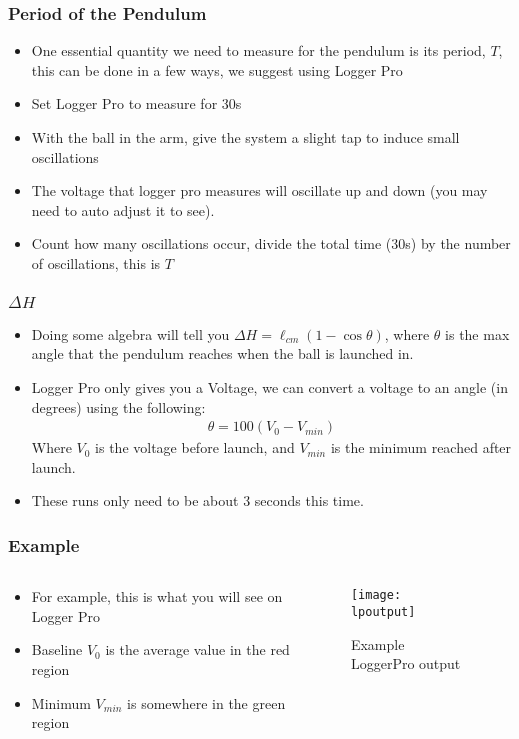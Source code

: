 \documentclass[aspectratio=169]{beamer}
\begin{document}
\begin{frame}
  \frametitle{Period of the Pendulum}
  \begin{itemize}
  \item One essential quantity we need to measure for the pendulum is its period, $T$, this can be done in a few ways, we suggest using Logger Pro
  \item Set Logger Pro to measure for 30s
  \item With the ball in the arm, give the system a slight tap to induce small oscillations
  \item The voltage that logger pro measures will oscillate up and down (you may need to auto adjust it to see).
  \item Count how many oscillations occur, divide the total time (30s) by the number of oscillations, this is $T$
  \end{itemize}
\end{frame}

\begin{frame}
  \frametitle{$\Delta H$}
  \begin{itemize}
  \item Doing some algebra will tell you $\Delta H=\ell_{cm}(1-\cos\theta)$, where $\theta$ is the max angle that the pendulum reaches when the ball is launched in. 
  \item Logger Pro only gives you a Voltage, we can convert a voltage to an angle (in degrees) using the following:
    \begin{align*}
      \theta=100(V_0-V_{min})
    \end{align*}
    Where $V_0$ is the voltage before launch, and $V_{min}$ is the minimum reached after launch.
  \item These runs only need to be about 3 seconds this time.
  \end{itemize}
\end{frame}

\begin{frame}
  \frametitle{Example}
  \begin{columns}
    \begin{column}{0.4\textwidth}
      \begin{itemize}
      \item For example, this is what you will see on Logger Pro
      \item Baseline {\color{red}$V_0$} is the average value in the {\color{red} red region}
      \item Minimum {\color{green}$V_{min}$} is somewhere in the {\color{green} green region}
      \end{itemize}
    \end{column}
    \begin{column}{0.6\textwidth}
      \begin{figure}[H]
        \centering
        \texttt{[image: lpoutput]}
        \caption{Example LoggerPro output}
      \end{figure}
    \end{column}
  \end{columns}
\end{frame}
\end{document}
